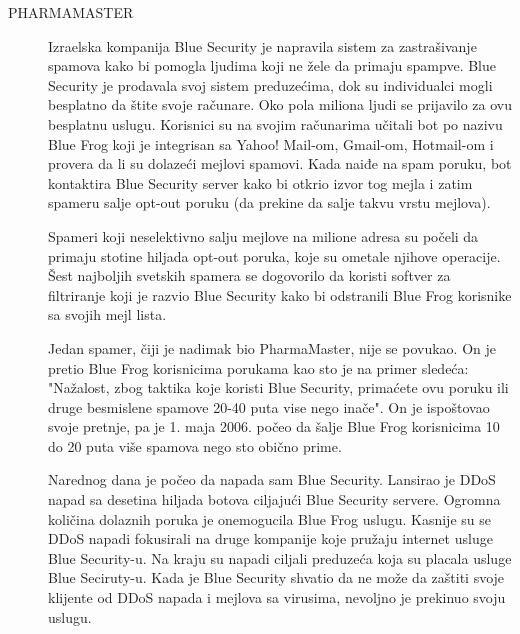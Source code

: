 \documentclass[a4paper]{article}
\begin{document}
{\begin{description}
\item[PHARMAMASTER] Izraelska kompanija Blue Security je napravila sistem za zastrašivanje spamova kako bi pomogla ljudima koji ne žele da primaju spampve. Blue Security je prodavala svoj sistem preduzećima, dok su individualci mogli besplatno da štite svoje računare. Oko pola miliona ljudi se prijavilo za ovu besplatnu uslugu. Korisnici su na svojim računarima učitali bot po nazivu Blue Frog koji je integrisan sa Yahoo! Mail-om, Gmail-om, Hotmail-om i provera da li su dolazeći mejlovi spamovi. Kada naiđe na spam poruku, bot kontaktira Blue Security server kako bi otkrio izvor tog mejla i zatim spameru salje opt-out poruku (da prekine da salje takvu vrstu mejlova).

Spameri koji neselektivno salju mejlove na milione adresa su počeli da primaju stotine hiljada opt-out poruka, koje su ometale njihove operacije. Šest najboljih svetskih spamera se dogovorilo da koristi softver za filtriranje koji je razvio Blue Security kako bi odstranili Blue Frog korisnike sa svojih mejl lista.

Jedan spamer, čiji je nadimak bio PharmaMaster, nije se povukao. On je pretio Blue Frog korisnicima porukama kao sto je na primer sledeća: "Nažalost, zbog taktika koje koristi Blue Security, primaćete ovu poruku ili druge besmislene spamove 20-40 puta vise nego inače". On je ispoštovao svoje pretnje, pa je 1. maja 2006. počeo da šalje Blue Frog korisnicima 10 do 20 puta više spamova nego sto obično prime.

Narednog dana je počeo da napada sam Blue Security. Lansirao je DDoS napad sa desetina hiljada botova ciljajući Blue Security servere. Ogromna količina dolaznih poruka je onemogucila Blue Frog uslugu. Kasnije su se DDoS napadi fokusirali na druge kompanije koje pružaju internet usluge Blue Security-u. Na kraju su napadi ciljali preduzeća koja su placala usluge Blue Seciruty-u. Kada je Blue Security shvatio da ne može da zaštiti svoje klijente od DDoS napada i mejlova sa virusima, nevoljno je prekinuo svoju uslugu.


\end{description}}
\end{document}
